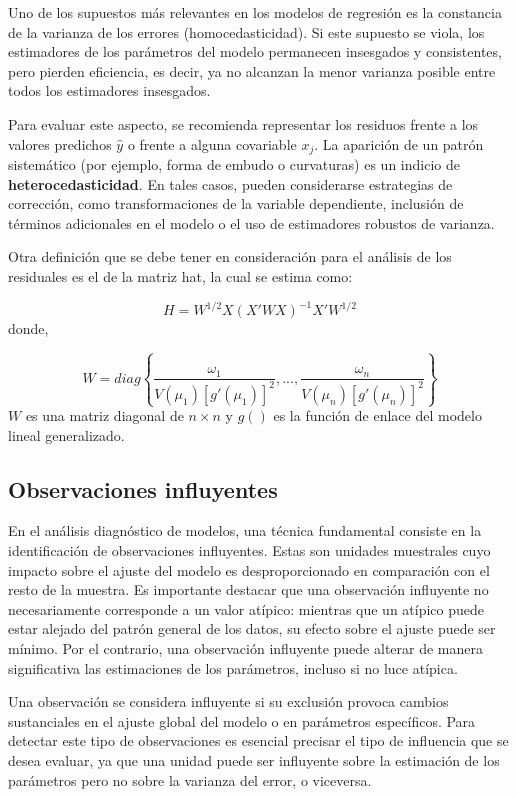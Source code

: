 \documentclass[
  spanish,
  12pt,
]{book}
\begin{document}
Uno de los supuestos más relevantes en los modelos de regresión es la constancia de la varianza de los errores (homocedasticidad). Si este supuesto se viola, los estimadores de los parámetros del modelo permanecen insesgados y consistentes, pero pierden eficiencia, es decir, ya no alcanzan la menor varianza posible entre todos los estimadores insesgados.

Para evaluar este aspecto, se recomienda representar los residuos frente a los valores predichos \(\hat{y}\) o frente a alguna covariable \(x_j\). La aparición de un patrón sistemático (por ejemplo, forma de embudo o curvaturas) es un indicio de \textbf{heterocedasticidad}. En tales casos, pueden considerarse estrategias de corrección, como transformaciones de la variable dependiente, inclusión de términos adicionales en el modelo o el uso de estimadores robustos de varianza.

Otra definición que se debe tener en consideración para el análisis de los residuales es el de la matriz hat, la cual se estima como:

\[
H  =  W^{1/2}X\left(X'WX\right)^{-1}X'W^{1/2}
\]
donde,

\[
W  =  diag\left\{ \frac{\omega_{1}}{V\left(\mu_{1}\right)\left[g'\left(\mu_{1}\right)\right]^{2}},...,\frac{\omega_{n}}{V\left(\mu_{n}\right)\left[g'\left(\mu_{n}\right)\right]^{2}}\right\}
\]
\(W\) es una matriz diagonal de \(n\times n\) y \(g()\) es la función de enlace del modelo lineal generalizado.

\subsection{Observaciones influyentes}\label{observaciones-influyentes}

En el análisis diagnóstico de modelos, una técnica fundamental consiste en la identificación de observaciones influyentes. Estas son unidades muestrales cuyo impacto sobre el ajuste del modelo es desproporcionado en comparación con el resto de la muestra. Es importante destacar que una observación influyente no necesariamente corresponde a un valor atípico: mientras que un atípico puede estar alejado del patrón general de los datos, su efecto sobre el ajuste puede ser mínimo. Por el contrario, una observación influyente puede alterar de manera significativa las estimaciones de los parámetros, incluso si no luce atípica.

Una observación se considera influyente si su exclusión provoca cambios sustanciales en el ajuste global del modelo o en parámetros específicos. Para detectar este tipo de observaciones es esencial precisar el tipo de influencia que se desea evaluar, ya que una unidad puede ser influyente sobre la estimación de los parámetros pero no sobre la varianza del error, o viceversa.
\end{document}
